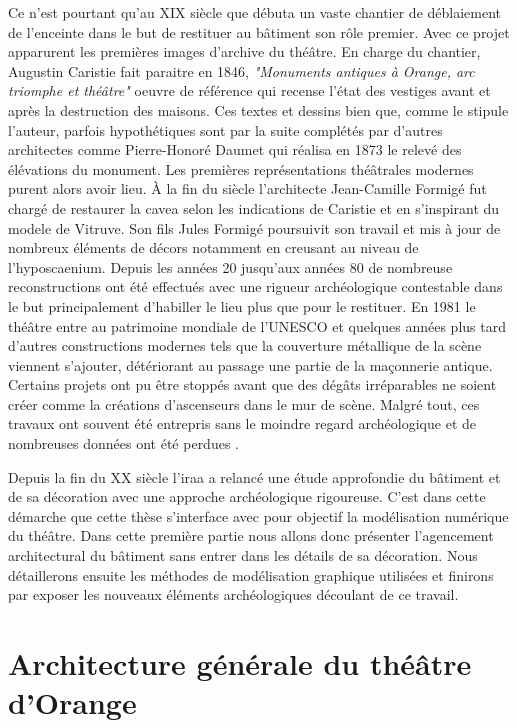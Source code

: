 			 Ce n'est pourtant qu'au XIX siècle que débuta un vaste chantier de déblaiement de l'enceinte dans le but de restituer au bâtiment son rôle premier. Avec ce projet apparurent les premières images d'archive du théâtre. En charge du chantier, Augustin Caristie fait paraitre en 1846, \textit{"Monuments antiques à Orange, arc triomphe et théâtre"} oeuvre de référence qui recense l'état des vestiges avant et après la destruction des maisons. Ces textes et dessins bien que, comme le stipule l'auteur, parfois hypothétiques sont par la suite complétés par d'autres architectes comme Pierre-Honoré Daumet qui réalisa en 1873 le relevé des élévations du monument. Les premières représentations théâtrales modernes purent alors avoir lieu. \`{A} la fin du siècle l'architecte Jean-Camille Formigé fut chargé de restaurer la cavea selon les indications de Caristie et en s'inspirant du modele de Vitruve. Son fils Jules Formigé poursuivit son travail et mis à jour de nombreux éléments de décors notamment en creusant au niveau de l'\gls{hyposcaenium}. Depuis les années 20 jusqu'aux années 80 de nombreuse reconstructions ont été effectués avec une rigueur archéologique contestable dans le but principalement d'habiller le lieu plus que pour le restituer. En 1981 le théâtre entre au patrimoine mondiale de l'UNESCO et quelques années plus tard d'autres constructions modernes tels que la couverture métallique de la scène viennent s'ajouter, détériorant au passage une partie de la maçonnerie antique. Certains projets ont pu être stoppés avant que des dégâts irréparables ne soient créer comme la créations d'ascenseurs dans le mur de scène. Malgré tout, ces travaux ont souvent été entrepris sans le moindre regard archéologique et de nombreuses données ont été perdues \citep{carteArcheo}.
			 
			 Depuis la fin du XX siècle l'\gls{iraa} a relancé une étude approfondie du bâtiment et de sa décoration avec une approche archéologique rigoureuse. C'est dans cette démarche que cette thèse s'interface avec pour objectif la modélisation numérique du théâtre. Dans cette première partie nous allons donc présenter l'agencement architectural du bâtiment sans entrer dans les détails de sa décoration. Nous détaillerons ensuite les méthodes de modélisation graphique utilisées et finirons par exposer les nouveaux éléments archéologiques découlant de ce travail.

	\chapter{Architecture générale du théâtre d'Orange}
		\minitoc
		\newpage
		
